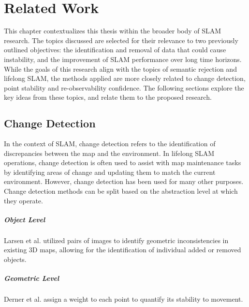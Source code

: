 \section{Related Work}
\label{sec:related_work}

This chapter contextualizes this thesis within the broader body of SLAM research. The topics discussed are selected for their relevance to two previously outlined objectives: the identification and removal of data that could cause instability, and the improvement of SLAM performance over long time horizons. While the goals of this research align with the topics of semantic rejection and lifelong SLAM, the methods applied are more closely related to change detection, point stability and re-observability confidence. The following sections explore the key ideas from these topics, and relate them to the proposed research.

\subsection{Change Detection}

In the context of SLAM, change detection refers to the identification of discrepancies between the map and the environment. In lifelong SLAM operations, change detection is often used to assist with map maintenance tasks by identifying areas of change and updating them to match the current environment. However, change detection has been used for many other purposes. Change detection methods can be split based on the abstraction level at which they operate.

\subparagraph{Object Level}
Larsen et al. \cite{larsenChangeDetectionModel} utilized pairs of images to identify geometric inconsistencies in existing 3D maps, allowing for the identification of individual added or removed objects.

\subparagraph{Geometric Level}
Derner et al. \cite{dernerChangeDetectionUsing2021} assign a weight to each point to quantify its stability to movement. 




